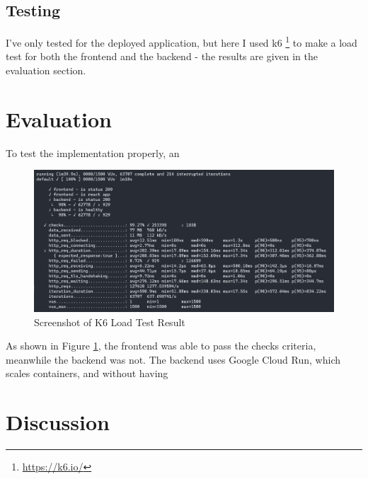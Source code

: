 \documentclass[11pt]{article}
\begin{document}
\subsection{Testing}
I've only tested for the deployed application, but here I used k6 \footnote{\href{https://k6.io/}{https://k6.io/}} to make a load test for both the frontend and the backend - the results are given in the evaluation section.


\section{Evaluation}

To test the implementation properly, an 

\begin{figure}[h]
	\centering
	\includegraphics[width=0.7\linewidth]{scr_k6_loadtest}
	\caption{Screenshot of K6 Load Test Result}
	\label{fig:scr:k6:loadtest}
\end{figure}

As shown in Figure \ref{fig:scr:k6:loadtest}, the frontend was able to pass the checks criteria, meanwhile the backend was not. The backend uses Google Cloud Run, which scales containers, and without having 

\section{Discussion}
\end{document}
